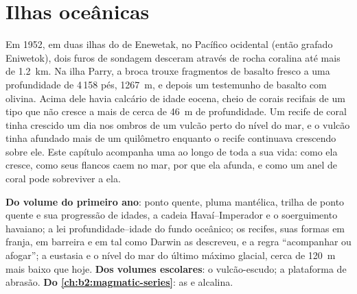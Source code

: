 \chapter{Ilhas oceânicas}\label{ch:b2:oceanic-islands}

Em 1952, em duas ilhas do  de Enewetak, no Pacífico ocidental (então grafado Eniwetok), dois
furos de sondagem desceram através de rocha coralina até mais de \qty{1.2}{km}. Na ilha Parry, a broca
trouxe fragmentos de basalto fresco a uma profundidade de 4\,158 pés, \qty{1267}{m}, e depois um testemunho de
basalto com olivina. Acima dele havia calcário de idade eocena, cheio de corais recifais de um tipo que não
cresce a mais de cerca de \qty{46}{m} de profundidade. Um recife de coral tinha crescido um dia nos ombros de um vulcão perto do
nível do mar, e o vulcão tinha afundado mais de um quilômetro enquanto o recife continuava crescendo sobre
ele. Este capítulo acompanha uma  ao longo de toda a sua vida: como ela cresce, como seus flancos
caem no mar, por que ela afunda, e como um anel de coral pode sobreviver a ela.

\begin{recall}
\textbf{Do volume do primeiro ano}: ponto quente, pluma mantélica, trilha de ponto quente e sua progressão de idades,
a cadeia Havaí--Imperador e o soerguimento havaiano; a lei profundidade--idade do fundo oceânico; os recifes,
suas formas em franja, em barreira e em  tal como Darwin as descreveu, e a regra ``acompanhar ou
afogar''; a eustasia e o nível do mar do último máximo glacial, cerca de \qty{120}{m} mais baixo que
hoje. \textbf{Dos volumes escolares}: o vulcão-escudo; a plataforma de abrasão.
\textbf{Do \cref{ch:b2:magmatic-series}}: as  e alcalina.
\end{recall}

